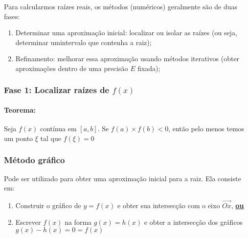 \documentclass{article}
\begin{document}

        Para calcularmos raízes reais, os métodos (numéricos) geralmente são de duas fases:

        \begin{enumerate}
            \item Determinar uma aproximação inicial: localizar ou isolar as raízes (ou seja, determinar umintervalo que contenha a raiz);
            \item Refinamento: melhorar essa aproximação usando métodos iterativos (obter aproximações dentro de uma precisão $E$ fixada);
        \end{enumerate}

        \subsubsection{Fase 1: Localizar raízes de $f(x)$}
        \paragraph{Teorema:} Seja $f(x)$ contínua em $[a,b]$. Se $f(a) \times f(b) < 0$, então pelo menos temos um ponto $\xi$ tal que $f(\xi) = 0$


        \subsubsection*{Método gráfico}
        Pode ser utilizado para obter uma aproximação inicial para a raiz. Ela consiste em:

        \begin{enumerate}
            \item Construir o gráfico de $y=f(x)$ e obter sua intersecção com o eixo $\vec{Ox}$, \textbf{\underline{ou}}
            \item Escrever $f(x)$ na forma $g(x) = h(x)$ e obter a intersecção dos gráficos $g(x) - h(x) = 0 = f(x)$
        \end{enumerate}
\end{document}
